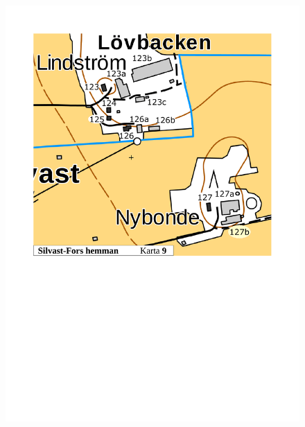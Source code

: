 \begin{figure}[htbp]
  \centering
  \includegraphics[width=1\textwidth]{kartor/Karta9.pdf}
  \label{map:9}
\end{figure}

